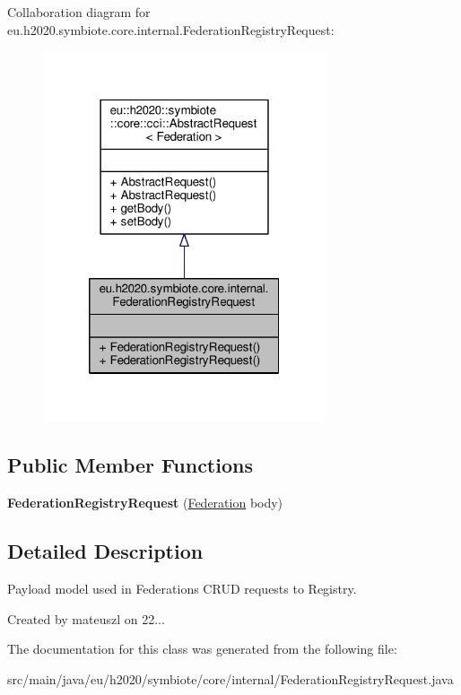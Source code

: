 Collaboration diagram for eu.\+h2020.\+symbiote.\+core.\+internal.\+Federation\+Registry\+Request\+:
\nopagebreak
\begin{figure}[H]
\begin{center}
\leavevmode
\includegraphics[width=236pt]{classeu_1_1h2020_1_1symbiote_1_1core_1_1internal_1_1FederationRegistryRequest__coll__graph}
\end{center}
\end{figure}
\subsection*{Public Member Functions}
\begin{DoxyCompactItemize}
\item 
\mbox{\label{classeu_1_1h2020_1_1symbiote_1_1core_1_1internal_1_1FederationRegistryRequest_a7c65955df7cec5f61c0d2033de7426db}} 
{\bfseries Federation\+Registry\+Request} (\hyperlink{classeu_1_1h2020_1_1symbiote_1_1model_1_1mim_1_1Federation}{Federation} body)
\end{DoxyCompactItemize}


\subsection{Detailed Description}
Payload model used in Federations C\+R\+UD requests to Registry. 

Created by mateuszl on 22... 

The documentation for this class was generated from the following file\+:\begin{DoxyCompactItemize}
\item 
src/main/java/eu/h2020/symbiote/core/internal/Federation\+Registry\+Request.\+java\end{DoxyCompactItemize}
